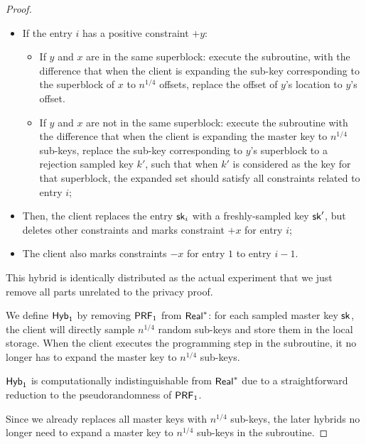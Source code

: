 \begin{proof}
\begin{itemize}
\begin{itemize}
            \item If the entry $i$ has a positive constraint $+y$:
            \begin{itemize}
                \item If $y$ and $x$ are in the same superblock: execute the subroutine, with the difference that when the client is expanding the sub-key corresponding to the superblock of $x$ to $n^{1/4}$ offsets, replace the offset of $y$'s location to $y$'s offset.
                
                \item If $y$ and $x$ are not in the same superblock: execute the subroutine with the difference that when the client is expanding the master key to $n^{1/4}$ sub-keys, replace the sub-key corresponding to $y$'s superblock to a rejection sampled key $k'$, such that when $k'$ is considered as the key for that superblock, the expanded set should satisfy all constraints related to entry $i$;
            \end{itemize}
            
            \item Then, the client replaces the entry $\mathsf{sk}_i$ with a freshly-sampled key $\mathsf{sk}'$, but deletes other constraints and marks constraint $+x$ for entry $i$;
            
            \item The client also marks constraints $-x$ for entry $1$ to entry $i-1$.
            
        \end{itemize}
        
    \end{itemize}
    
    This hybrid is identically distributed as the actual experiment that we just remove all parts unrelated to the privacy proof.
    
    
    We define ${\sf Hyb}_1$ by removing $\mathsf{PRF}_1$ from ${\sf Real}^*$: for each sampled master key $\mathsf{sk}$, the client will directly sample $n^{1/4}$ random sub-keys and store them in the local storage. 
    When the client executes the programming step in the subroutine, it no longer has to expand the master key to $n^{1/4}$ sub-keys. 
    
    ${\sf Hyb}_1$ is computationally indistinguishable from ${\sf Real}^*$ due to a straightforward reduction to the pseudorandomness of $\mathsf{PRF}_1$.
    
    Since we already replaces all master keys with $n^{1/4}$ sub-keys, the later hybrids no longer need to expand a master key to $n^{1/4}$ sub-keys in the subroutine. 
    

\end{proof}
